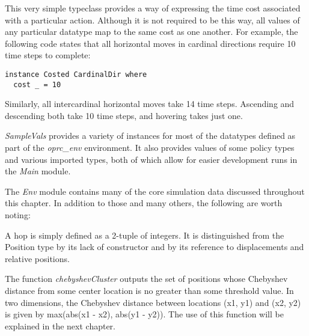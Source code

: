 This very simple typeclass provides a way of expressing the time cost associated with a particular action. Although it is not required to be this way, all values of any particular datatype map to the same cost as one another. For example, the following code states that all horizontal moves in cardinal directions require 10 time steps to complete: 

\begin{verbatim}
instance Costed CardinalDir where
  cost _ = 10
\end{verbatim}

Similarly, all intercardinal horizontal moves take 14 time steps. Ascending and descending both take 10 time steps, and hovering takes just one.

\textit{SampleVals} provides a variety of instances for most of the datatypes defined as part of the \textit{oprc\_env} environment. It also provides values of some policy types and various imported types, both of which allow for easier development runs in the \textit{Main} module.

The \textit{Env} module contains many of the core simulation data discussed throughout this chapter. In addition to those and many others, the following are worth noting:

A hop is simply defined as a 2-tuple of integers. It is distinguished from the Position type by its lack of constructor and by its reference to displacements and relative positions.

The function \textit{chebyshevCluster} outputs the set of positions whose Chebyshev distance from some center location is no greater than some threshold value. In two dimensions, the Chebyshev distance between locations (x1, y1) and (x2, y2) is given by max(abs(x1 - x2), abs(y1 - y2)). The use of this function will be explained in the next chapter.